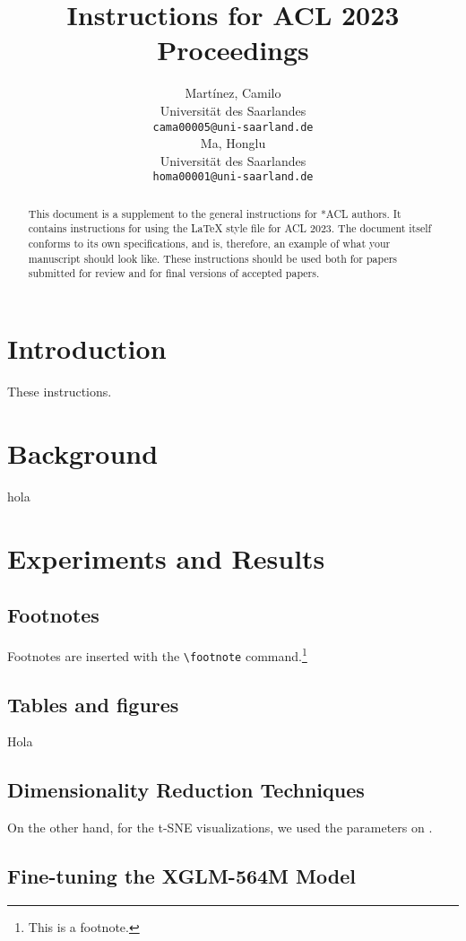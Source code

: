 \documentclass[11pt]{article}
\title{Instructions for ACL 2023 Proceedings}
\author{Martínez, Camilo \\
  Universität des Saarlandes \\
  \texttt{cama00005@uni-saarland.de} \\\And
  Ma, Honglu \\
  Universität des Saarlandes \\
  \texttt{homa00001@uni-saarland.de} \\}
\begin{document}
\maketitle
\begin{abstract}
    This document is a supplement to the general instructions for *ACL authors. It contains instructions for using the \LaTeX{} style file for ACL 2023.
    The document itself conforms to its own specifications, and is, therefore, an example of what your manuscript should look like.
    These instructions should be used both for papers submitted for review and for final versions of accepted papers.
\end{abstract}

\section{Introduction}

These instructions.

\section{Background}

hola

\section{Experiments and Results}

\subsection{Footnotes}

Footnotes are inserted with the \verb|\footnote| command.\footnote{This is a footnote.}

\subsection{Tables and figures}

Hola

\subsection{Dimensionality Reduction Techniques}

On the other hand, for the t-SNE visualizations, we used the parameters on \cite{GOVE202287}.

\subsection{Fine-tuning the XGLM-564M Model}
\end{document}
